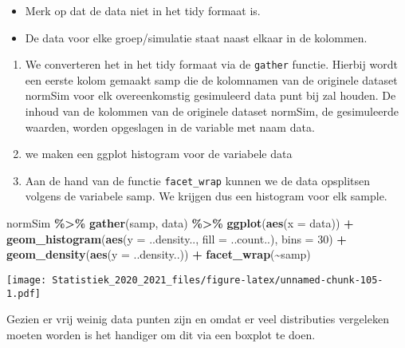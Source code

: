 \documentclass[
  12pt,dutch,coursenotes]{book}
\newenvironment{Shaded}{\begin{snugshade}}{\end{snugshade}}
\newcommand{\DataTypeTok}[1]{\textcolor[rgb]{0.13,0.29,0.53}{#1}}
\newcommand{\DecValTok}[1]{\textcolor[rgb]{0.00,0.00,0.81}{#1}}
\newcommand{\KeywordTok}[1]{\textcolor[rgb]{0.13,0.29,0.53}{\textbf{#1}}}
\newcommand{\NormalTok}[1]{#1}
\newcommand{\OperatorTok}[1]{\textcolor[rgb]{0.81,0.36,0.00}{\textbf{#1}}}
\newcommand{\StringTok}[1]{\textcolor[rgb]{0.31,0.60,0.02}{#1}}
\providecommand{\tightlist}{%
  \setlength{\itemsep}{0pt}\setlength{\parskip}{0pt}}
\theoremstyle{definition}
\theoremstyle{definition}
\theoremstyle{definition}
\theoremstyle{remark}
\begin{document}
\begin{itemize}
\tightlist
\item
  Merk op dat de data niet in het tidy formaat is.
\item
  De data voor elke groep/simulatie staat naast elkaar in de kolommen.
\end{itemize}

\begin{enumerate}
\def\labelenumi{\arabic{enumi}.}
\item
  We converteren het in het tidy formaat via de \texttt{gather} functie. Hierbij wordt een eerste kolom gemaakt samp die de kolomnamen van de originele dataset normSim voor elk overeenkomstig gesimuleerd data punt bij zal houden. De inhoud van de kolommen van de originele dataset normSim, de gesimuleerde waarden, worden opgeslagen in de variable met naam data.
\item
  we maken een ggplot histogram voor de variabele data
\item
  Aan de hand van de functie \texttt{facet\_wrap} kunnen we de data opsplitsen volgens de variabele samp. We krijgen dus een histogram voor elk sample.
\end{enumerate}

\begin{Shaded}
\begin{Highlighting}[]
\NormalTok{normSim }\OperatorTok{\%\textgreater{}\%}\StringTok{ }\KeywordTok{gather}\NormalTok{(samp, data) }\OperatorTok{\%\textgreater{}\%}\StringTok{ }\KeywordTok{ggplot}\NormalTok{(}\KeywordTok{aes}\NormalTok{(}\DataTypeTok{x =}\NormalTok{ data)) }\OperatorTok{+}\StringTok{ }
\StringTok{    }\KeywordTok{geom\_histogram}\NormalTok{(}\KeywordTok{aes}\NormalTok{(}\DataTypeTok{y =}\NormalTok{ ..density.., }\DataTypeTok{fill =}\NormalTok{ ..count..), }
        \DataTypeTok{bins =} \DecValTok{30}\NormalTok{) }\OperatorTok{+}\StringTok{ }\KeywordTok{geom\_density}\NormalTok{(}\KeywordTok{aes}\NormalTok{(}\DataTypeTok{y =}\NormalTok{ ..density..)) }\OperatorTok{+}\StringTok{ }
\StringTok{    }\KeywordTok{facet\_wrap}\NormalTok{(}\OperatorTok{\textasciitilde{}}\NormalTok{samp)}
\end{Highlighting}
\end{Shaded}

\texttt{[image: Statistiek\_2020\_2021\_files/figure-latex/unnamed-chunk-105-1.pdf]}

Gezien er vrij weinig data punten zijn en omdat er veel distributies vergeleken moeten worden is het handiger om dit via een boxplot te doen.
\end{document}
